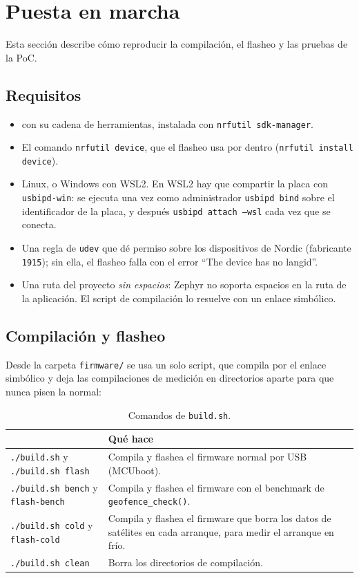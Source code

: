 \section{Puesta en marcha}

Esta sección describe cómo reproducir la compilación, el flasheo y las pruebas de la PoC.

\subsection{Requisitos}

\begin{itemize}
  \item \dNcs{} con su cadena de herramientas, instalada con \texttt{nrfutil sdk-manager}.
  \item El comando \texttt{nrfutil device}, que el flasheo usa por dentro (\texttt{nrfutil install device}).
  \item Linux, o Windows con WSL2. En WSL2 hay que compartir la placa con \texttt{usbipd-win}: se
        ejecuta una vez como administrador \texttt{usbipd bind} sobre el identificador de la placa,
        y después \texttt{usbipd attach --wsl} cada vez que se conecta.
  \item Una regla de \texttt{udev} que dé permiso sobre los dispositivos de Nordic
        (fabricante \texttt{1915}); sin ella, el flasheo falla con el error ``The device has no
        langid''.
  \item Una ruta del proyecto \emph{sin espacios}: Zephyr no soporta espacios en la ruta de la
        aplicación. El script de compilación lo resuelve con un enlace simbólico.
\end{itemize}

\subsection{Compilación y flasheo}

Desde la carpeta \texttt{firmware/} se usa un solo script, que compila por el enlace simbólico y
deja las compilaciones de medición en directorios aparte para que nunca pisen la normal:

\begin{table}[H]
\centering
\small
\begin{tabularx}{\textwidth}{|l X|}
\hline
\tablehead{\textbf{Comando} & \textbf{Qué hace}} \\ \hline
\texttt{./build.sh} y \texttt{./build.sh flash} & Compila y flashea el firmware normal por USB (MCUboot). \\ \hline
\texttt{./build.sh bench} y \texttt{flash-bench} & Compila y flashea el firmware con el benchmark de \texttt{geofence\_check()}. \\ \hline
\texttt{./build.sh cold} y \texttt{flash-cold} & Compila y flashea el firmware que borra los datos de satélites en cada arranque, para medir el arranque en frío. \\ \hline
\texttt{./build.sh clean} & Borra los directorios de compilación. \\ \hline
\end{tabularx}
\caption{Comandos de \texttt{build.sh}.}
\end{table}

